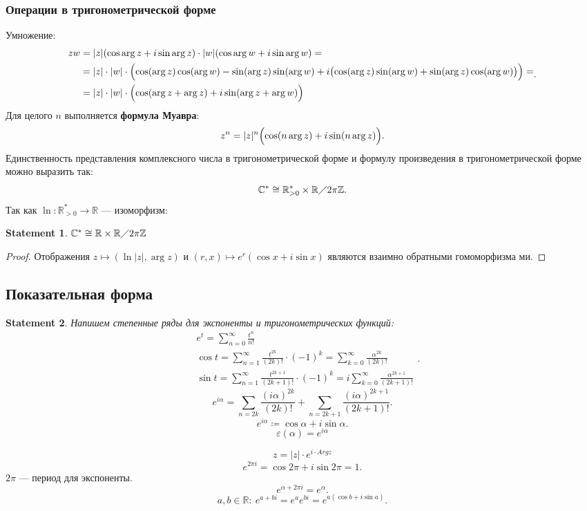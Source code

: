 \documentclass[11pt]{book}
\newcommand{\Z}{\mathbb{Z}}
\newcommand{\R}{\mathbb{R}}
\newcommand{\Cm}{\mathbb{C}}
\newcommand{\slim}{\sum\limits}
\newcommand{\po}{\diagup}
\theoremstyle{definition}
\theoremstyle{plain}
\theoremstyle{plain}
\newtheorem{st}{Statement}
\theoremstyle{definition}
\theoremstyle{remark}
\begin{document}
\subsubsection{Операции в тригонометрической форме}
Умножение:
\[
    \begin{aligned}
	zw &= |z|(\cos \arg z + i \sin \arg z) \cdot |w|(\cos \arg w + i \sin \arg w) = \\
	   &= |z|\cdot |w| \cdot \Bigl( \cos (\arg z) \cos  ( \arg w) - \sin(\arg z) \sin(\arg w)
	   + i\bigl(\cos (\arg z) \sin(\arg w) + \sin (\arg z) \cos(\arg w)\bigr)\Bigr)  = \\
	   & = |z| \cdot |w| \cdot \Bigl( \cos (\arg z + \arg z) + i \sin (\arg z + \arg w)\Bigr)
    \end{aligned}
.\]
Для целого $ n$ выполняется {\bf формула Муавра}:
\[
    z^{n} = |z|^{n} \Bigl( \cos (n \arg z) + i \sin(n \arg z)\Bigr)
.\]
Единственность представления  комплексного числа в тригонометрической форме и формулу произведения в тригонометрической форме можно выразить так:
\[
    \Cm^{*} \cong \R_{>0}^{*} \times \R \po 2 \pi\Z
.\]
Так как $ \ln : \R_{>0}^{*} \to  \R$ --- изоморфизм:
\begin{st}
    $ \Cm^{*} \cong \R \times \R \po 2 \pi \Z$
\end{st}
\begin{proof}
    Отображения $ z \mapsto (\ln |z|, \arg z)$ и $ (r, x) \mapsto e^{r}(\cos x + i \sin x)$ являются взаимно обратными гомоморфизма ми.
\end{proof}
\subsection{Показательная форма}
\begin{st}
    Напишем степенные ряды для экспоненты и тригонометрических функций:
    \[
	\begin{aligned}
	    & e^{t} = \slim_{n=0}^{\infty} \frac{t ^{n}}{n!}\\
	    & \cos t = \slim_{n=1}^{ \infty} \frac{t ^{2k}}{(2k)!} \cdot (-1)^{k} = \slim_{k=0}^{\infty} \frac{ \alpha ^{2k}}{(2k)!}\\
	    & \sin t = \slim_{n=1}^{ \infty} \frac{t ^{2k+1}}{(2k+1)!} \cdot (-1)^{k} = i\slim_{k=0}^{\infty} \frac{ \alpha ^{2k+1}}{(2k+1)!}
	\end{aligned}
    .\]
    \[
	e ^{i \alpha} = \slim_{n= 2k} \frac{(i\alpha)^{2k}}{(2k)!} + \slim_{n= 2k+1}\frac{(i \alpha )^{2k+1}}{(2k+1)!} %
    .\]
    \[
	e ^{i \alpha} \coloneqq \cos \alpha + i \sin \alpha
    .\]
    $$ \varepsilon  ( \alpha ) = e ^{i \alpha }$$
\end{st}
\begin{defn}
    $$z = |z| \cdot e ^{i \cdot Arg z}$$
    \[
	e^{2\pi i} = \cos 2\pi + i \sin 2\pi = 1
    .\]
    $2
    \pi$ --- период для экспоненты.
    \[
	e ^{\alpha + 2\pi i} = e^{ \alpha }
    .\]
    \[
	a, b \in  \R: ~ e^{a + bi} = e ^{ a} e ^{bi} = e^{a ( \cos b + i \sin a)}
    .\]
\end{defn}
\end{document}
